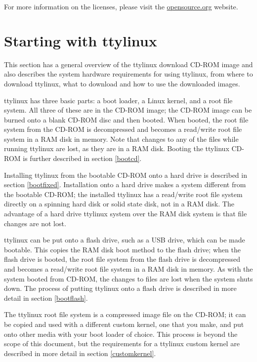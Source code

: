 \documentclass[10pt]{article}
\begin{document}
For more information on the licenses, please visit the \url{opensource.org}
website.

\newpage
\section{Starting with ttylinux}

This section has a general overview of the ttylinux download CD-ROM image and
also describes the system hardware requirements for using ttylinux, from where
to download ttylinux, what to download and how to use the downloaded images.

ttylinux has three basic parts: a boot loader, a Linux kernel, and a root
file system. All three of these are in the CD-ROM image; the CD-ROM image can
be burned onto a blank CD-ROM disc and then booted. When booted, the root
file system from the CD-ROM is decompressed and becomes a read/write root file
system in a RAM disk in memory. Note that changes to any of the files while
running ttylinux are lost, as they are in a RAM disk. Booting the ttylinux
CD-ROM is further described in section \ref{bootcd}.

Installing ttylinux from the bootable CD-ROM onto a hard drive is described in
section \ref{bootfixed}. Installation onto a hard drive makes a system
different from the bootable CD-ROM; the installed ttylinux has a read/write
root file system directly on a spinning hard disk or solid state disk, not in a
RAM disk. The advantage of a hard drive ttylinux system over the RAM disk
system is that file changes are not lost.

ttylinux can be put onto a flash drive, such as a USB drive, which can be made
bootable. This copies the RAM disk boot method to the flash drive; when the
flash drive is booted, the root file system from the flash drive is decompressed
and becomes a read/write root file system in a RAM disk in memory. As with the
system booted from CD-ROM, the changes to files are lost when the system shuts
down. The process of putting ttylinux onto a flash drive is described in more
detail in section \ref{bootflash}.

The ttylinux root file system is a compressed image file on the CD-ROM; it can
be copied and used with a different custom kernel, one that you make, and put
onto other media with your boot loader of choice. This process is beyond the
scope of this document, but the requirements for a ttylinux custom kernel are
described in more detail in section \ref{customkernel}.
\end{document}
